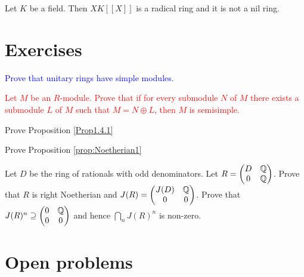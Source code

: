 \begin{example} 
Let $K$ be a field. Then $XK[\![X]\!]$ is a radical ring 
and it is not a nil ring.
\end{example}


\section{Exercises}

\begin{prob}
    \label{prob:Zorn_simple}
    \textcolor{blue}{Prove that unitary rings have simple modules.} 
\end{prob}
\begin{prob}
\textcolor{red}{Let $M$ be an $R$-module. Prove that if for every submodule $N$ of $M$ there exists a submodule $L$ of $M$ such that $M=N\oplus L$, then $M$ is semisimple.}
\end{prob}
\begin{prob}
Prove Proposition \ref{Prop1.4.1}
\end{prob}
\begin{prob}
Prove Proposition \ref{prop:Noetherian1}
\end{prob}

\begin{prob}
\label{prob:Herstein}
Let $D$ be the ring of rationals with odd denominators. Let
$R=\begin{pmatrix}
    D & \mathbb{Q}\\
    0 & \mathbb{Q}
\end{pmatrix}$. Prove that $R$ is right Noetherian and 
$J(R)=\begin{pmatrix}
J(D) & \mathbb{Q}\\
0 & 0
\end{pmatrix}$. Prove that 
$J(R)^n\supseteq\begin{pmatrix}0&\mathbb{Q}\\0&0\end{pmatrix}$ and hence $\bigcap_nJ(R)^n$ is non-zero. 
\end{prob}

\section{Open problems}




